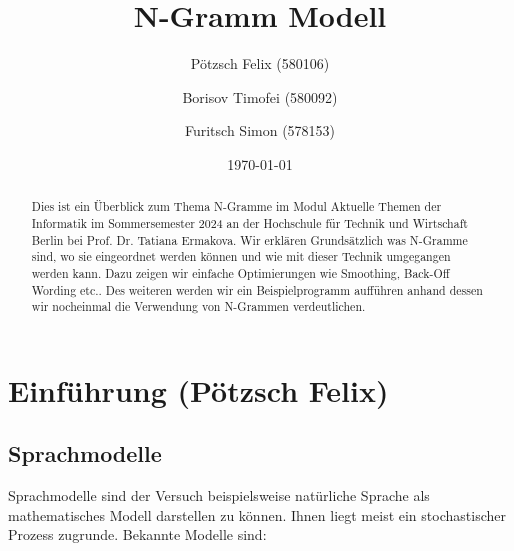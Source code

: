 \documentclass[12pt]{article}
\title{N-Gramm Modell}
\author{
  Pötzsch Felix (580106)\\
  \and
  Borisov Timofei (580092) \\
  \and
  Furitsch Simon (578153)\\
}
\date{\today}
\begin{document}
\maketitle

\begin{abstract}
	Dies ist ein Überblick zum Thema N-Gramme im Modul
	Aktuelle Themen der Informatik im Sommersemester 2024 an der
	Hochschule für Technik und Wirtschaft Berlin bei Prof. Dr. Tatiana Ermakova.
	Wir erklären Grundsätzlich was N-Gramme sind, wo sie eingeordnet werden können und wie mit dieser Technik umgegangen werden kann.
	Dazu zeigen wir einfache Optimierungen wie Smoothing, Back-Off Wording etc..
	Des weiteren werden wir ein Beispielprogramm aufführen anhand dessen wir nocheinmal
	die Verwendung von N-Grammen verdeutlichen.
\end{abstract}

\tableofcontents
\clearpage

\section{Einführung (Pötzsch Felix)}

\subsection{Sprachmodelle}
Sprachmodelle sind der Versuch beispielsweise natürliche Sprache als mathematisches
Modell darstellen zu können. Ihnen liegt meist ein stochastischer Prozess zugrunde.
Bekannte Modelle sind:
\end{document}
